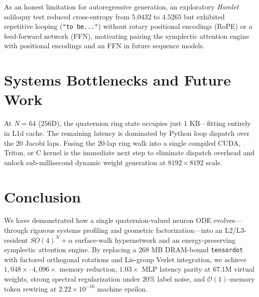 \documentclass[11pt,twocolumn]{article}
\begin{document}
As an honest limitation for autoregressive generation, an exploratory \textit{Hamlet} soliloquy test reduced cross-entropy from $5.0432$ to $4.5265$ but exhibited repetitive looping (\texttt{"to be..."}) without rotary positional encodings (RoPE) or a feed-forward network (FFN), motivating pairing the symplectic attention engine with positional encodings and an FFN in future sequence models.

\section{Systems Bottlenecks and Future Work}
At $N=64$ ($256\text{D}$), the quaternion ring state occupies just $1\text{ KB}$—fitting entirely in L1d cache. The remaining latency is dominated by Python loop dispatch over the $20$ Jacobi laps. Fusing the $20$-lap ring walk into a single compiled CUDA, Triton, or C kernel is the immediate next step to eliminate dispatch overhead and unlock sub-millisecond dynamic weight generation at $8192 \times 8192$ scale.

\section{Conclusion}
We have demonstrated how a single quaternion-valued neuron ODE evolves—through rigorous systems profiling and geometric factorization—into an L2/L3-resident $SO(4)^N + \alpha$ surface-walk hypernetwork and an energy-preserving symplectic attention engine. By replacing a $268\text{ MB}$ DRAM-bound \texttt{tensordot} with factored orthogonal rotations and Lie-group Verlet integration, we achieve $1{,}048\times$--$4{,}096\times$ memory reduction, $1.03\times$ MLP latency parity at $67.1\text{M}$ virtual weights, strong spectral regularization under $20\%$ label noise, and $\mathcal{O}(1)$-memory token rewiring at $2.22 \times 10^{-16}$ machine epsilon.
\end{document}
